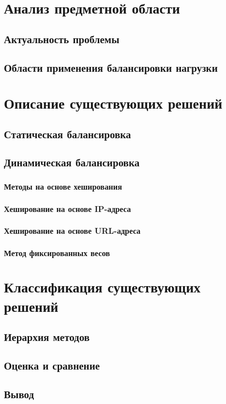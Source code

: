 \section{Анализ предметной области}

\subsection{Актуальность проблемы}

\subsection{Области применения балансировки нагрузки}

\section{Описание существующих решений}

\subsection{Статическая балансировка}

\subsection{Динамическая балансировка}


\subsubsection{Методы на основе хеширования}

\subsubsection*{Хеширование на основе IP-адреса}

\subsubsection*{Хеширование на основе URL-адреса}

\subsubsection{Метод фиксированных весов}

\section{Классификация существующих решений}

\subsection{Иерархия методов}

\subsection{Оценка и сравнение}

\subsection{Вывод}
